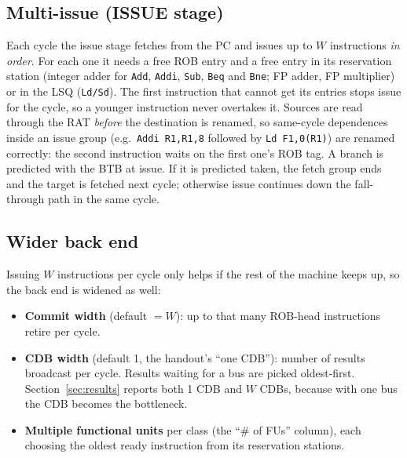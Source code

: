 \documentclass[11pt]{article}
\begin{document}
\subsection{Multi-issue (ISSUE stage)}
Each cycle the issue stage fetches from the PC and issues up to $W$ instructions \emph{in order}.
For each one it needs a free ROB entry and a free entry in its reservation station (integer adder
for \texttt{Add}, \texttt{Addi}, \texttt{Sub}, \texttt{Beq} and \texttt{Bne}; FP adder, FP multiplier) or in the LSQ (\texttt{Ld/Sd}). The
first instruction that cannot get its entries stops issue for the cycle, so a younger instruction
never overtakes it. Sources are read through the RAT \emph{before} the destination is renamed, so
same-cycle dependences inside an issue group (e.g.\ \texttt{Addi R1,R1,8} followed by
\texttt{Ld F1,0(R1)}) are renamed correctly: the second instruction waits on the first one's ROB
tag. A branch is predicted with the BTB at issue. If it is predicted taken, the fetch group ends
and the target is fetched next cycle; otherwise issue continues down the fall-through path in the
same cycle.

\subsection{Wider back end}
Issuing $W$ instructions per cycle only helps if the rest of the machine keeps up, so the
back end is widened as well:
\begin{itemize}
  \item \textbf{Commit width} (default $=W$): up to that many ROB-head instructions retire per cycle.
  \item \textbf{CDB width} (default 1, the handout's ``one CDB''): number of results broadcast per
        cycle. Results waiting for a bus are picked oldest-first. Section~\ref{sec:results} reports
        both 1 CDB and $W$ CDBs, because with one bus the CDB becomes the bottleneck.
  \item \textbf{Multiple functional units} per class (the ``\# of FUs'' column), each choosing the
        oldest ready instruction from its reservation stations.
\end{itemize}
\end{document}
